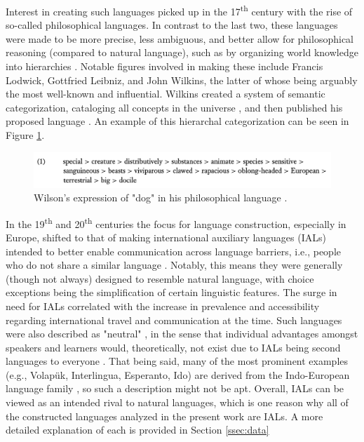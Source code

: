 \documentclass[12pt,a4paper]{article}
\numberwithin{figure}{section}
\numberwithin{table}{section}
\numberwithin{definition}{section}
\begin{document}
Interest in creating such languages picked up in the 17\textsuperscript{th} century with the rise of so-called philosophical languages. In contrast to the last two, these languages were made to be more precise, less ambiguous, and better allow for philosophical reasoning (compared to natural language), such as by organizing world knowledge into hierarchies \parencite{goodall2022article}. Notable figures involved in making these include Francis Lodwick, Gottfried Leibniz, and John Wilkins, the latter of whose being arguably the most well-known and influential. Wilkins created a system of semantic categorization, cataloging all concepts in the universe \parencite{okrent2009book}, and then published his proposed language \parencite{Wilkins1968book}. An example of this hierarchal categorization can be seen in Figure \ref{fig:wilsonslanguageexample}.


\begin{figure}
  \centering
        \includegraphics[width=\textwidth]{./Other/WilsonsLanguageExample.png}
        \caption{Wilson's expression of "dog" in his philosophical language \parencite{goodall2022article}.}
        \label{fig:wilsonslanguageexample}
\end{figure}


In the 19\textsuperscript{th} and 20\textsuperscript{th} centuries the focus for language construction, especially in Europe, shifted to that of making international auxiliary languages (IALs) intended to better enable communication across language barriers, i.e., people who do not share a similar language \parencite{goodall2022article}. Notably, this means they were generally (though not always) designed to resemble natural language, with choice exceptions being the simplification of certain linguistic features. The surge in need for IALs correlated with the increase in prevalence and accessibility regarding international travel and communication at the time. Such languages were also described as "neutral" \parencite{Large1985book}, in the sense that individual advantages amongst speakers and learners would, theoretically, not exist due to IALs being second languages to everyone \parencite{Gobbo2016article}. That being said, many of the most prominent examples (e.g., Volapük, Interlingua, Esperanto, Ido) are derived from the Indo-European language family \parencite{Novikov2022article,goodall2022article}, so such a description might not be apt. Overall, IALs can be viewed as an intended rival to natural languages, which is one reason why all of the constructed languages analyzed in the present work are IALs. A more detailed explanation of each is provided in Section \ref{ssec:data}
\end{document}
